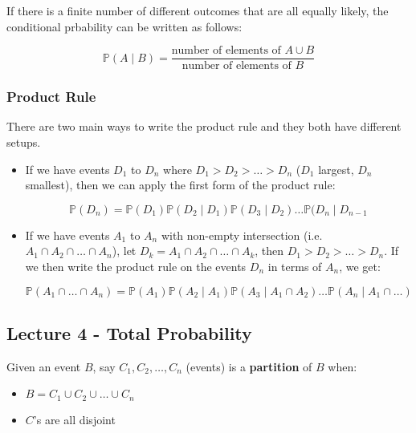 \documentclass{article}
\begin{document}
If there is a finite number of different outcomes that are all equally
likely, the conditional prbability can be written as follows:

\begin{equation}
  \boxed{
    \mathbb{P}(A \mid B) = \frac{\text{number of elements of } A \cup
      B}{\text{number of elements of } B}
  }
\end{equation}

\subsubsection{Product Rule}

There are two main ways to write the product rule and they both have
different setups.

\begin{itemize}
\item If we have events $D_1$ to $D_n$ where $D_1 > D_2 > \dots > D_n$
  ($D_1$ largest, $D_n$ smallest), then we can apply the first form of
  the product rule:

  \begin{equation}
    \tag{Product Rule 1}
    \boxed{
      \mathbb{P}(D_n) = \mathbb{P}(D_1) \mathbb{P}(D_2 \mid D_1)
      \mathbb{P}(D_3 \mid D_2) \dots \mathbb{P}(D_n \mid D_{n-1}
    }
  \end{equation}

\item If we have events $A_1$ to $A_n$ with non-empty intersection
  (i.e. $A_1 \cap A_2 \cap \dots \cap A_n$), let $D_k = A_1 \cap A_2
  \cap \dots \cap A_k$, then $D_1 > D_2 > \dots > D_n$. If we then
  write the product rule on the events $D_n$ in terms of $A_n$, we
  get:

  \begin{equation}
    \tag{Product Rule 2}
    \boxed{
      \mathbb{P}(A_1 \cap \dots \cap A_n) = \mathbb{P}(A_1)
      \mathbb{P}(A_2 \mid A_1) \mathbb{P}(A_3 \mid A_1 \cap A_2) \dots
      \mathbb{P}(A_n \mid A_1 \cap \dots)
    }
  \end{equation}
\end{itemize}


\medskip\hline
\subsection{Lecture 4 - Total Probability}

Given an event $B$, say $C_1, C_2, \dots, C_n$ (events) is a
\textbf{partition} of $B$ when:
\begin{itemize}
\item $B = C_1 \cup C_2 \cup \dots \cup C_n$
\item $C$'s are all disjoint
\end{itemize}
\end{document}
